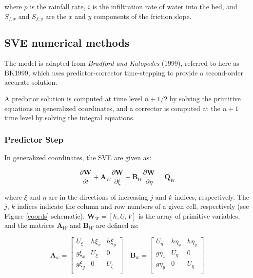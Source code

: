 \documentclass{article}
\begin{document}
where $p$ is the rainfall rate,   $i$ is the infiltration rate of water into the bed, and $S_{f,x}$ and $S_{f,y}$ are the $x$ and $y$ components of the friction slope. 


\subsection{SVE numerical methods}

 The model is adapted from  \textit{Bradford and Katopodes} (1999), referred to here as BK1999,  which uses predictor-corrector time-stepping to provide a second-order accurate solution.
  
  A predictor solution is computed at  time level $n + 1/2$ by solving the primitive equations in generalized coordinates, and a corrector is computed at the $n + 1$ time level by solving the integral equations.  
   
 \subsubsection*{Predictor Step}

In generalized coordinates, the SVE  are given as: 

\begin{equation}
\dfrac{\partial \mathbf{W}}{\partial t} + 
	\mathbf{A}_W	\dfrac{\partial \mathbf{W}}{\partial \xi} + 
	\mathbf{B}_W	\dfrac{\partial \mathbf{W}}{\partial \eta} =
	\mathbf{Q}_W
\label{predictor}
\end{equation}

\noindent where $\xi$ and $\eta$ are in the directions of increasing $j$ and $k$ indices, respectively.
The  $j$, $k$ indices indicate the column and row numbers of a given cell, respectively (see Figure \ref{coords} schematic).
$\mathbf{W_T} = [h, U, V]$ is the array of primitive variables, and the matrices $\mathbf{A}_W$ and $\mathbf{B}_W$ are defined as:

\[ \mathbf{A}_w = 
\begin{bmatrix}
    U_{\xi} & h \xi_x & h \xi_{y} \\
    g \xi_x &    U_{\xi}  & 0    \\
    g \xi_y &   0   & U_{\xi}    \\    
\end{bmatrix} \quad \mathbf{B}_w = 
\begin{bmatrix}
    U_{\eta} & h \eta_x    & h \eta_{y} \\
    g \eta_x &    U_{\eta}  & 0    \\
    g \eta_y &      0       & U_{\eta}    \\    
\end{bmatrix} 		
\]	
\end{document}
